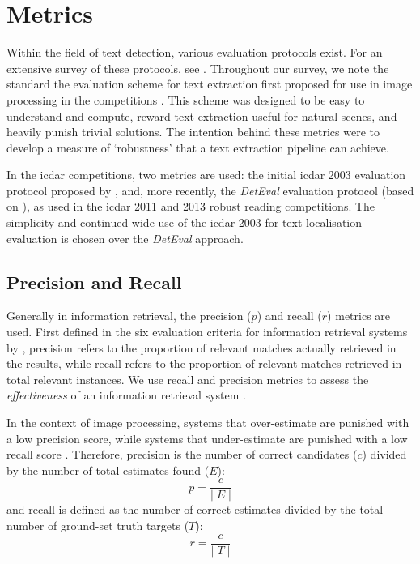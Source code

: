 \section{Metrics}
\label{sec:background:metrics}

Within the field of text detection, various evaluation protocols exist. For an extensive survey of these protocols, see \citep{Wolf:2006gv,Ye:2014bs}. Throughout our survey, we note the standard the evaluation scheme for text extraction first proposed for use in image processing in the  competitions \citep{Lucas:2003iw, Lucas:2005bq, Shahab:2011hq, Karatzas:2013by, Karatzas:2015tj}. This scheme was designed to be easy to understand and compute, reward text extraction useful for natural scenes, and heavily punish trivial solutions. The intention behind these metrics were to develop a measure of `robustness' that a text extraction pipeline can achieve. 

In the \gls{icdar} competitions, two metrics are used: the initial \gls{icdar} 2003 evaluation protocol proposed by \citet{Lucas:2003iw}, and, more recently, the \textit{DetEval} evaluation protocol \citep{Shivakumara:2011dn} (based on \citep{Wolf:2006gv}), as used in the \gls{icdar} 2011 and 2013 robust reading competitions. The simplicity and continued wide use of the \gls{icdar} 2003 for text localisation evaluation is chosen over the \textit{DetEval} approach.

\subsection{Precision and Recall}
\label{sec:background:metrics:precision_and_recall}

Generally in information retrieval, the precision ($p$) and recall ($r$) metrics are used. First defined in the six evaluation criteria for information retrieval systems by \citet{Cleverdon:1966vd}, precision refers to the proportion of relevant matches actually retrieved in the results, while recall refers to the proportion of relevant matches retrieved in total relevant instances. We use recall and precision metrics to assess the \textit{effectiveness} of an information retrieval system \citep{Rijsbergen:1979dw}.

In the context of image processing, systems that over-estimate are punished with a low precision score, while systems that under-estimate are punished with a low recall score \citep{Lucas:2003iw}. Therefore, precision is the number of correct candidates ($c$) divided by the number of total estimates found ($E$):
\begin{equation*}
  p = \frac{c}{\lvert\;E\;\rvert}
\end{equation*}
and recall is defined as the number of correct estimates divided by the total number of ground-set truth targets ($T$):
\begin{equation*}
  r = \frac{c}{\lvert\;T\;\rvert}
\end{equation*}

